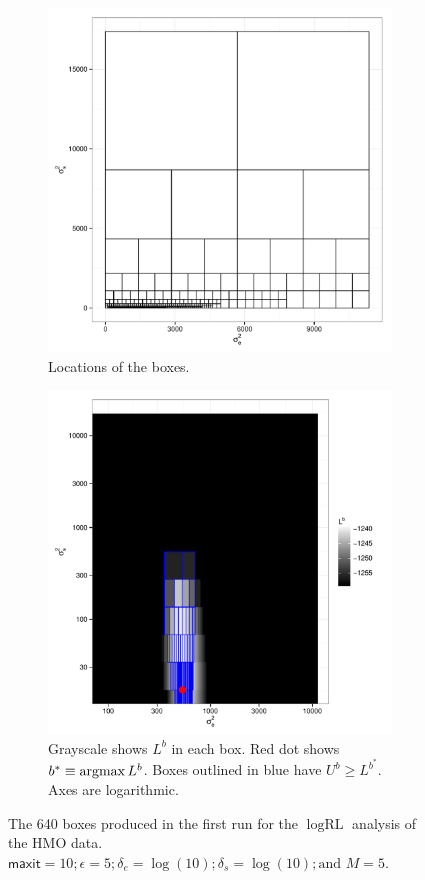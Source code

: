 \documentclass{report}
\newcommand{\textcompute}{\textsf}
\newcommand{\RLorig}{\text{RL}}
\newcommand{\logRLorig}{\log\RLorig}
\newcommand{\maxit}{\textcompute{maxit}}
\newcommand{\argmax}{\operatornamewithlimits{argmax}}
\begin{document}
\begin{figure}
  \begin{subfigure}{.5\textwidth}
	\centering
	\includegraphics[width=.8\linewidth]{figs/hmo_HH11_boxes.pdf}
	\caption{Locations of the boxes.}
	\label{fig:hmoboxes}
  \end{subfigure}
  \begin{subfigure}{.5\textwidth}
	\centering
	\includegraphics[width=.8\linewidth]{figs/hmo_HH11_rll.pdf}
	\caption{Grayscale shows $L^b$ in each box.  Red dot shows $b^* \equiv\argmax L^b$.
	Boxes outlined in blue have $U^b \ge L^{b^*}$.  Axes are logarithmic.}
	\label{fig:hmorll}
  \end{subfigure}
  \caption{The 640 boxes produced in the first run  for the
	$\logRLorig$ analysis of the HMO data. $\maxit=10; \epsilon=5;
	\delta_e=\log(10); \delta_s=\log(10); \text{and\ } M=5$.}
  \label{fig:hmo1}
\end{figure}
\end{document}
